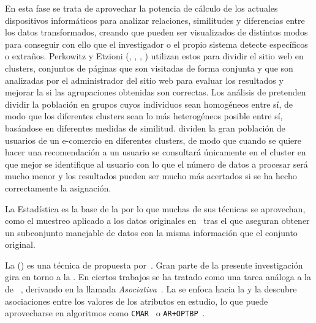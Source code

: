 En esta fase se trata de aprovechar la potencia de cálculo de los actuales dispositivos informáticos para analizar relaciones, similitudes y diferencias entre los datos transformados, creando \patrones que pueden ser visualizados de distintos modos para conseguir con ello que el investigador o el propio sistema detecte \patrones específicos o extraños. Perkowitz y Etzioni (\cite*{PerkowitzEtzioni-AWSAutomaticallySynthesizingWebPages-1998}, \cite*{PerkowitzEtzioni-AWSConceptualClusterMining-1999}, \cite*{PerkowitzEtzioni-TowardsAdaptiveWebSites-1999}, \cite*{PerkowitzEtzioni-TowardsAdaptiveWebSites-2000}) utilizan estos \patrones para dividir el sitio web en clusters, conjuntos de páginas que son visitadas de forma conjunta y que son analizadas por el administrador del sitio web para evaluar los resultados y mejorar la \ux si las agrupaciones obtenidas son correctas. Los análisis de \clustering pretenden dividir la población en grupos cuyos individuos sean homogéneos entre sí, de modo que los diferentes clusters sean lo más heterogéneos posible entre sí, basándose en diferentes medidas de similitud. \citet{SchaferKonstanRiedl-ECommerceRecomendation-2001} dividen la gran población de usuarios de un e-comercio en diferentes clusters, de modo que cuando se quiere hacer una recomendación a un usuario se consultará únicamente en el cluster en que mejor se identifique al usuario con lo que el número de datos a procesar será mucho menor y los resultados pueden ser mucho más acertados si se ha hecho correctamente la asignación.

La Estadística es la base de la \dm por lo que muchas de sus técnicas se aprovechan, como el muestreo aplicado a los datos originales en~\citet{OzmutluSpinkOzmutlu-AnalysisOfLargeDataLogs-2002} tras el que aseguran obtener un subconjunto manejable de datos con la misma información que el conjunto original.

La \arm (\ARM) es una técnica de \DM propuesta por~\citet{AgrawalImielinskiSwami-MiningAssociationRulesBetweenSetsOfItemsInLargeDB-1993}. Gran parte de la presente investigación gira en torno a la \ARM. En ciertos trabajos se ha tratado como una tarea análoga a la de \clasificacion~\citep{KohaviQuinlan-DecisionTreeDiscovery-1999}, derivando en la llamada \emph{\Clasificacion Asociativa}~\citep{LiuHsuMa-IntegratingClassificationAndARM-1998}. La \clasificacion se enfoca hacia la \prediccion y la \ARM descubre asociaciones entre los valores de los atributos en estudio, lo que puede aprovecharse en algoritmos como \texttt{CMAR}~\citep{ThabtahCowlingHammoud-ImprovingRuleSorting-2006} o \texttt{AR+OPTBP}~\citep{KahramanliAllahverdi-NewMethodForComposingClassificationRulesARplusOPTBP-2009}.

